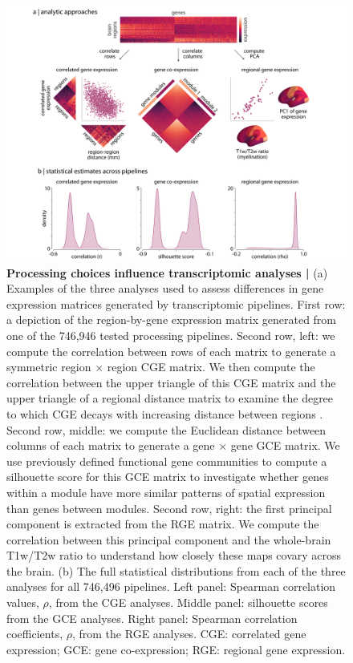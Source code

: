 \documentclass[12pt,aps,pra,reprint,showkeys]{revtex4-1}
\begin{document}
\begin{figure}[htp]
  \begin{center}
    \centerline{\includegraphics[width=\textwidth]{pipeline_distributions.png}}
    \caption{
      \textbf{Processing choices influence transcriptomic analyses |}
      (a) Examples of the three analyses used to assess differences in gene expression matrices generated by transcriptomic pipelines.
      First row: a depiction of the region-by-gene expression matrix generated from one of the 746,946 tested processing pipelines.
      Second row, left: we compute the correlation between rows of each matrix to generate a symmetric region $\times$ region CGE matrix.
      We then compute the correlation between the upper triangle of this CGE matrix and the upper triangle of a regional distance matrix to examine the degree to which CGE decays with increasing distance between regions \citep{arnatkeviciute2019neuroimage}.
      Second row, middle: we compute the Euclidean distance between columns of each matrix to generate a gene $\times$ gene GCE matrix.
      We use previously defined functional gene communities \citep{oldham2008natneuro} to compute a silhouette score for this GCE matrix to investigate whether genes within a module have more similar patterns of spatial expression than genes between modules.
      Second row, right: the first principal component is extracted from the RGE matrix.
      We compute the correlation between this principal component and the whole-brain T1w/T2w ratio \citep{burt2018natneuro} to understand how closely these maps covary across the brain.
      (b) The full statistical distributions from each of the three analyses for all 746,496 pipelines.
      Left panel: Spearman correlation values, $\rho$, from the CGE analyses.
      Middle panel: silhouette scores from the GCE analyses.
      Right panel: Spearman correlation coefficients, $\rho$, from the RGE analyses.
      CGE: correlated gene expression; GCE: gene co-expression; RGE: regional gene expression.
      }
    \label{figure-pipeline-distributions}
  \end{center}
\end{figure}
\end{document}

